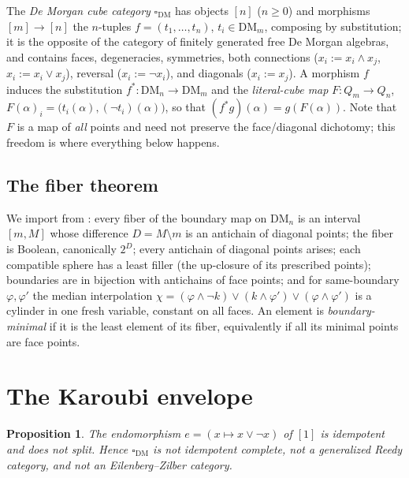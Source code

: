 \documentclass[11pt]{amsart}
\newtheorem{prop}[thm]{Proposition}
\theoremstyle{definition}
\newcommand{\DM}{\mathrm{DM}}
\newcommand{\cube}{\square_{\mathrm{DM}}}
\newcommand{\lc}{Q}
\begin{document}
The \emph{De Morgan cube category} $\cube$ has objects $[n]$
($n \geq 0$) and morphisms $[m] \to [n]$ the $n$-tuples
$f = (t_1, \dots, t_n)$, $t_i \in \DM_m$, composing by
substitution; it is the opposite of the category of finitely
generated free De Morgan algebras, and contains faces,
degeneracies, symmetries, both connections
($x_i := x_i \wedge x_j$, $x_i := x_i \vee x_j$), reversal
($x_i := \neg x_i$), and diagonals ($x_i := x_j$).  A morphism $f$
induces the substitution $f^{*} : \DM_n \to \DM_m$ and the
\emph{literal-cube map} $F : \lc_m \to \lc_n$,
$F(\alpha)_i = \bigl(t_i(\alpha), (\neg t_i)(\alpha)\bigr)$, so that
$(f^{*}g)(\alpha) = g(F(\alpha))$.  Note that $F$ is a map of
\emph{all} points and need not preserve the face/diagonal
dichotomy; this freedom is where everything below happens.

\subsection{The fiber theorem}

We import from \cite{DMFibers}: every fiber of the boundary map on
$\DM_n$ is an interval $[m, M]$ whose difference
$D = M \setminus m$ is an antichain of diagonal points; the fiber
is Boolean, canonically $2^{D}$; every antichain of diagonal points
arises; each compatible sphere has a least filler (the up-closure of
its prescribed points); boundaries are in bijection with antichains
of face points; and for same-boundary $\varphi, \varphi'$ the median
interpolation
$\chi = (\varphi \wedge \neg k) \vee (k \wedge \varphi') \vee
(\varphi \wedge \varphi')$ is a cylinder in one fresh variable,
constant on all faces.  An element is \emph{boundary-minimal} if it
is the least element of its fiber, equivalently if all its minimal
points are face points.

\section{The Karoubi envelope}
\label{sec:karoubi}

\begin{prop}
  \label{prop:nonsplit}
  The endomorphism $e = (x \mapsto x \vee \neg x)$ of $[1]$ is
  idempotent and does not split.  Hence $\cube$ is not idempotent
  complete, not a generalized Reedy category, and not an
  Eilenberg--Zilber category.
\end{prop}
\end{document}
